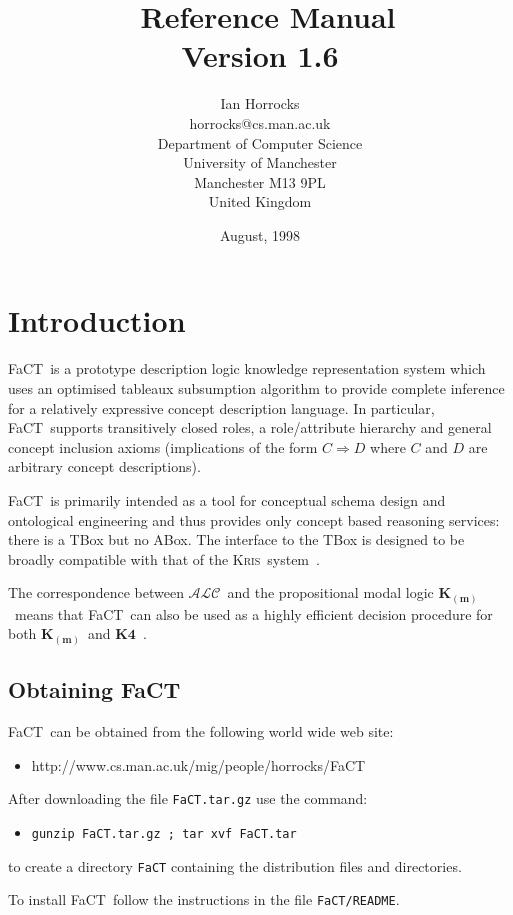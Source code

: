 \documentclass[12pt,titlepage]{article}
\title{\FaCT\ Reference Manual\\Version 1.6}
\author{Ian Horrocks\\%
        {\small horrocks@cs.man.ac.uk}\\[2ex]%
        Department of Computer Science\\%
        University of Manchester\\%
        Manchester M13 9PL\\%
        United Kingdom}
\date{August, 1998}
\newcommand{\FaCT}{FaCT}
\newcommand{\ALC}{\ensuremath{\mathcal{ALC}}\xspace}
\newcommand{\Kris}{\textsc{Kris}\xspace}
\newcommand{\Km}{\ensuremath{\mathbf{K}_{(\mathbf{m})}}\xspace}
\newcommand{\Kfour}{\ensuremath{\mathbf{K4}}\xspace}
\begin{document}
\maketitle

\tableofcontents
\newpage

\section{Introduction}

\FaCT\ is a prototype description logic knowledge representation
system which uses an optimised tableaux subsumption algorithm to
provide complete inference for a relatively expressive concept
description language. In particular, \FaCT\ supports transitively
closed roles, a role/attribute hierarchy and general concept inclusion
axioms (implications of the form $C \Rightarrow D$ where $C$ and $D$
are arbitrary concept descriptions).

\FaCT\ is primarily intended as a tool for conceptual schema design
and ontological engineering and thus provides only concept based
reasoning services: there is a TBox but no ABox. The interface to the
TBox is designed to be broadly compatible with that of the \Kris\
system~\cite{Baader91a}.

The correspondence between \ALC\ and the propositional modal logic
\Km\ means that \FaCT\ can also be used as a highly efficient
decision procedure for both \Km\ and \Kfour~\cite{Giunchiglia96b,
Hustadt97a}.


\subsection{Obtaining \FaCT}

\FaCT\ can be obtained from the following world wide web site:
%
\begin{itemize}
\item[] \textrm{http://www.cs.man.ac.uk/mig/people/horrocks/FaCT}
\end{itemize}

After downloading the file \texttt{\FaCT.tar.gz} use the command:
%
\begin{itemize}
\item[] \texttt{gunzip \FaCT.tar.gz ; tar xvf \FaCT.tar}
\end{itemize}
%
to create a directory \texttt{\FaCT} containing the distribution
files and directories.

To install \FaCT\ follow the instructions in the file \texttt{\FaCT/README}.
\end{document}
